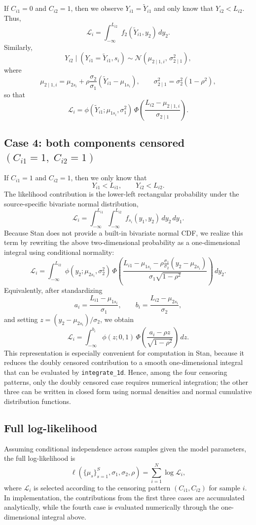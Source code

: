 \documentclass[12pt]{article}
\begin{document}
If \(C_{i1}=0\) and \(C_{i2}=1\), then we observe \(Y_{i1}=\tilde Y_{i1}\) and only know that \(Y_{i2}<L_{i2}\). Thus,
\[
\mathcal L_i
=
\int_{-\infty}^{L_{i2}}
f_2(\tilde Y_{i1},y_2)\,dy_2.
\]
Similarly,
\[
Y_{i2}\mid (Y_{i1}=\tilde Y_{i1}, s_i)
\sim
\mathcal N\!\left(
\mu_{2\mid 1,i},\,
\sigma_{2\mid 1}^2
\right),
\]
where
\[
\mu_{2\mid 1,i}
=
\mu_{2s_i}
+
\rho\frac{\sigma_2}{\sigma_1}(\tilde Y_{i1}-\mu_{1s_i}),
\qquad
\sigma_{2\mid 1}^2
=
\sigma_2^2(1-\rho^2),
\]
so that
\[
\mathcal L_i
=
\phi(\tilde Y_{i1};\mu_{1s_i},\sigma_1^2)\,
\Phi\!\left(
\frac{L_{i2}-\mu_{2\mid 1,i}}{\sigma_{2\mid 1}}
\right).
\]

\subsection*{Case 4: both components censored \((C_{i1}=1,\; C_{i2}=1)\)}

If \(C_{i1}=1\) and \(C_{i2}=1\), then we only know that
\[
Y_{i1}<L_{i1},
\qquad
Y_{i2}<L_{i2}.
\]
The likelihood contribution is the lower-left rectangular probability under the source-specific bivariate normal distribution,
\[
\mathcal L_i
=
\int_{-\infty}^{L_{i1}}
\int_{-\infty}^{L_{i2}}
f_{s_i}(y_1,y_2)\,dy_2\,dy_1.
\]
Because Stan does not provide a built-in bivariate normal CDF, we realize this term by rewriting the above two-dimensional probability as a one-dimensional integral using conditional normality:
\[
\mathcal L_i
=
\int_{-\infty}^{L_{i2}}
\phi(y_2;\mu_{2s_i},\sigma_2^2)\,
\Phi\!\left(
\frac{
L_{i1}-\mu_{1s_i}-\rho\frac{\sigma_1}{\sigma_2}(y_2-\mu_{2s_i})
}{
\sigma_1\sqrt{1-\rho^2}
}
\right)\,dy_2.
\]
Equivalently, after standardizing
\[
a_i=\frac{L_{i1}-\mu_{1s_i}}{\sigma_1},
\qquad
b_i=\frac{L_{i2}-\mu_{2s_i}}{\sigma_2},
\]
and setting \(z=(y_2-\mu_{2s_i})/\sigma_2\), we obtain
\[
\mathcal L_i
=
\int_{-\infty}^{b_i}
\phi(z;0,1)\,
\Phi\!\left(
\frac{a_i-\rho z}{\sqrt{1-\rho^2}}
\right)\,dz.
\]
This representation is especially convenient for computation in Stan, because it reduces the doubly censored contribution to a smooth one-dimensional integral that can be evaluated by \texttt{integrate\_1d}. Hence, among the four censoring patterns, only the doubly censored case requires numerical integration; the other three can be written in closed form using normal densities and normal cumulative distribution functions.

\subsection*{Full log-likelihood}

Assuming conditional independence across samples given the model parameters, the full log-likelihood is
\[
\ell(\{\mu_s\}_{s=1}^S,\sigma_1,\sigma_2,\rho)
=
\sum_{i=1}^N \log \mathcal L_i,
\]
where \(\mathcal L_i\) is selected according to the censoring pattern \((C_{i1},C_{i2})\) for sample \(i\). In implementation, the contributions from the first three cases are accumulated analytically, while the fourth case is evaluated numerically through the one-dimensional integral above.
\end{document}
